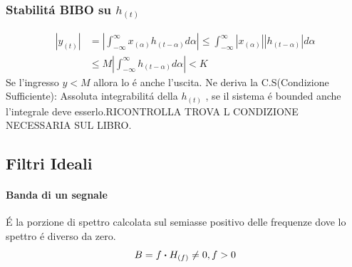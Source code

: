         \subsubsection{Stabilitá BIBO su $h_{(t)}$}
            \begin{align}
                |y_{(t)}| &= \left|\int_{-\infty}^{\infty}x_{(\alpha)}h_{(t-\alpha)} d\alpha \right|\leq \int_{-\infty}^{\infty}|x_{(\alpha)}||h_{(t-\alpha)}| d\alpha \nonumber \\
                          &\leq M\left|\int_{-\infty}^{\infty}h_{(t-\alpha)} d\alpha \right| <K\nonumber
            \end{align}
            Se l'ingresso $y<M$ allora lo é anche l'uscita. Ne deriva la C.S(Condizione Sufficiente): Assoluta integrabilitá della $h_{(t)}$ ,
            se il sistema é bounded anche l'integrale deve esserlo.RICONTROLLA
            TROVA L CONDIZIONE NECESSARIA SUL LIBRO.
    \subsection{Filtri Ideali}
        \paragraph{Banda di un segnale} É la porzione di spettro calcolata sul semiasse positivo delle
        frequenze dove lo spettro é diverso da zero.
        \[
            B = {f\dotproduct H_{(f)} \neq 0, f >0}  
        \]
